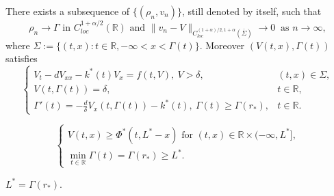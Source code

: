 \documentclass[10pt,a4paper]{amsart}
\begin{document}
\begin{lemma}\label{lem-lim}
  There exists a subsequence of $\{(\rho_n, v_n)\}$, still denoted by  itself, such that
  \begin{equation*}
    \rho_n\to \Gamma \text{ in } C^{1+\alpha/2}_{loc}(\mathbb{R}) \text{  and }\|v_n-V\|_{C_{loc}^{(1+\alpha)/2,1+\alpha}(\overline\Sigma)}\to 0 ~\text{ as } n\to \infty,
  \end{equation*}
  where $\Sigma:=\{(t,x):t\in\mathbb{R}, -\infty<x< \Gamma(t)\}$. Moreover $(V(t,x),\Gamma(t))$ satisfies
  \begin{equation}\label{eq-V}
    \begin{cases}
      V_t-dV_{xx}-k^*(t)V_x=f(t,V), ~V>\delta, &(t,x)\in\Sigma,\\
      V(t,\Gamma(t))=\delta, &t\in\mathbb{R},\\
      \Gamma'(t)=-\frac{d}{\delta}V_x(t,\Gamma(t))-k^*(t),~ \Gamma(t)\geq \Gamma(r_*), &t\in\mathbb R.
    \end{cases}
  \end{equation}
\end{lemma}

\begin{equation}\label{eq-vpr}
 \begin{cases} V(t,x)\geq \Phi^*(t,L^*-x) \text{ for }(t,x)\in\mathbb{R}\times(-\infty,L^*],\\
 \min_{t\in\mathbb R}\Gamma(t)=\Gamma (r_*)\geq  L^*.
 \end{cases}
\end{equation}

  \begin{lemma}\label{lemm-gr}
$L^*=\Gamma(r_*)$.
\end{lemma}
\end{document}
